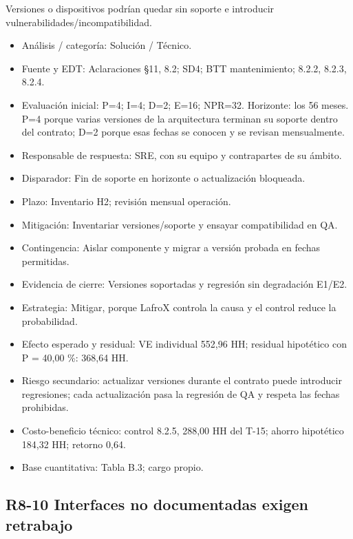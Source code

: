 Versiones o dispositivos podrían quedar sin soporte e introducir vulnerabilidades/incompatibilidad.

\begin{itemize}[leftmargin=*,itemsep=3pt]
\item Análisis / categoría: Solución / Técnico.
\item Fuente y EDT: Aclaraciones §11, 8.2; SD4; BTT mantenimiento; 8.2.2, 8.2.3, 8.2.4.
\item Evaluación inicial: P=4; I=4; D=2; E=16; NPR=32. Horizonte: los 56 meses. P=4 porque varias versiones de la arquitectura terminan su soporte dentro del contrato; D=2 porque esas fechas se conocen y se revisan mensualmente.
\item Responsable de respuesta: SRE, con su equipo y contrapartes de su ámbito.
\item Disparador: Fin de soporte en horizonte o actualización bloqueada.
\item Plazo: Inventario H2; revisión mensual operación.
\item Mitigación: Inventariar versiones/soporte y ensayar compatibilidad en QA.
\item Contingencia: Aislar componente y migrar a versión probada en fechas permitidas.
\item Evidencia de cierre: Versiones soportadas y regresión sin degradación E1/E2.
\item Estrategia: Mitigar, porque LafroX controla la causa y el control reduce la probabilidad.
\item Efecto esperado y residual: VE individual 552,96 HH; residual hipotético con P = 40,00 \%: 368,64 HH.
\item Riesgo secundario: actualizar versiones durante el contrato puede introducir regresiones; cada actualización pasa la regresión de QA y respeta las fechas prohibidas.
\item Costo-beneficio técnico: control 8.2.5, 288,00 HH del T-15; ahorro hipotético 184,32 HH; retorno 0,64.
\item Base cuantitativa: Tabla B.3; cargo propio.
\end{itemize}

\subsection*{R8-10 \textemdash{} Interfaces no documentadas exigen retrabajo}


